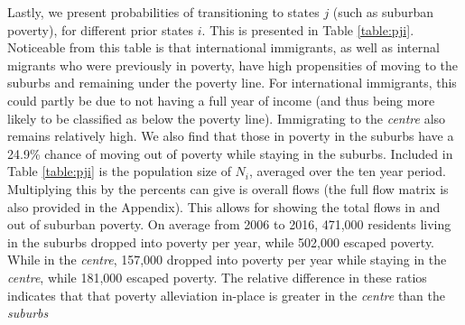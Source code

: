Lastly, we present probabilities of transitioning to states $j$ (such as suburban poverty), for different prior states $i$. This is presented in Table \ref{table:pji}. Noticeable from this table is that international immigrants, as well as internal migrants who were previously in poverty, have high propensities of moving to the suburbs and remaining under the poverty line. For international immigrants, this could partly be due to not having a full year of income (and thus being more likely to be classified as below the poverty line). Immigrating to the \textit{centre} also remains relatively high. We also find that those in poverty in the suburbs have a 24.9\% chance of moving out of poverty while staying in the suburbs. Included in Table \ref{table:pji} is the population size of $N_i$, averaged over the ten year period. Multiplying this by the percents can give is overall flows (the full flow matrix is also provided in the Appendix). This allows for showing the total flows in and out of suburban poverty. On average from 2006 to 2016, 471,000 residents living in the suburbs dropped into poverty per year, while 502,000 escaped poverty. While in the \textit{centre}, 157,000 dropped into poverty per year while staying in the \textit{centre}, while 181,000 escaped poverty. The relative difference in these ratios indicates that that poverty alleviation in-place is greater in the \textit{centre} than the \textit{suburbs} 



